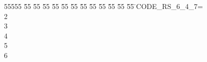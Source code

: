 %
%
\begin{tabbing}
55555 \= 55 \= 55 \= 55 \= 55 \= 55 \= 55 \= 55 \= 55 \= 55 \= 55 \= 55 \= 55 \= \>CODE\_RS\_6\_4\_7=\\[0pt]
2\ \\[0pt]
3\ \\[0pt]
4\ \\[0pt]
5\\[0pt]
6\>\end{tabbing}

